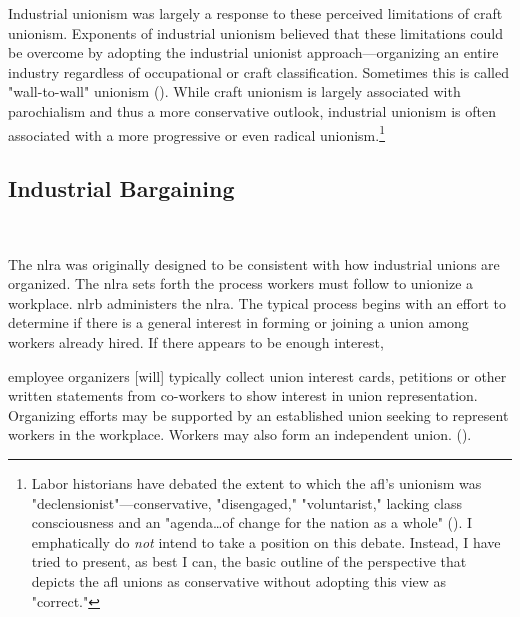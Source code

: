 \documentclass[12pt]{article}
\renewenvironment{quote}
  {\list{}{\leftmargin=\parindent\rightmargin=0pt}%
   \item\relax}
  {\endlist}
\begin{document}
Industrial unionism was largely a response to these perceived limitations of craft unionism. Exponents of industrial unionism believed that these limitations could be overcome by adopting the industrial unionist approach---organizing an entire industry regardless of occupational or craft classification. Sometimes this is called "wall-to-wall" unionism (\cite{meyersWhatAreMy2023}). While craft unionism is largely associated with parochialism and thus a more conservative outlook, industrial unionism is often associated with a more progressive or even radical unionism.\footnote{Labor historians have debated the extent to which the \acrshort{afl}'s unionism was "declensionist"---conservative, "disengaged," "voluntarist," lacking class consciousness and an "agenda\ldots{}of change for the nation as a whole" (\cite[61–62]{cobblePureSimpleRadicalism2013}). I emphatically do \emph{not} intend to take a position on this debate. Instead, I have tried to present, as best I can, the basic outline of the perspective that depicts the \acrshort{afl} unions as conservative without adopting this view as "correct."}

\subsection{Industrial Bargaining}\label{ind_bargain}\

The \acrfull{nlra} was originally designed to be consistent with how industrial unions are organized. The \acrshort{nlra} sets forth the process workers must follow to unionize a workplace. \acrfull{nlrb} administers the \acrshort{nlra}. The typical process begins with an effort to determine if there is a general interest in forming or joining a union among workers already hired. If there appears to be enough interest, 

\begin{quote}
employee organizers [will] typically collect union interest cards, petitions or other written statements from co-workers to show interest in union representation. Organizing efforts may be supported by an established union seeking to represent workers in the workplace. Workers may also form an independent union. (\cite["How can I form a union?"]{dolWORKCenterUnions}).
\end{quote} 
\end{document}
